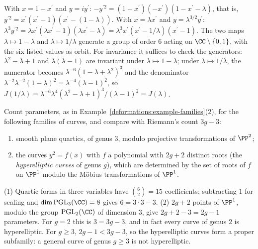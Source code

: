 \begin{solution}
With $x = 1 - x^{\prime}$ and $y = iy^{\prime}$: $-y^{\prime 2} = (1 - x^{\prime})(-x^{\prime})(1 - x^{\prime} - \lambda)$, that is, $y^{\prime 2} = x^{\prime}(x^{\prime} - 1)(x^{\prime} - (1 - \lambda))$. With $x = \lambda x^{\prime}$ and
$y = \lambda^{3/2}y^{\prime}$: $\lambda^3y^{\prime 2} = \lambda x^{\prime}(\lambda x^{\prime} - 1)(\lambda x^{\prime} - \lambda) = \lambda^3x^{\prime}(x^{\prime} - 1/\lambda)(x^{\prime} - 1)$. The two maps $\lambda \mapsto 1 - \lambda$ and
$\lambda \mapsto 1/\lambda$ generate a group of order $6$ acting on $\CC \setminus \{0, 1\}$, with the six listed values as orbit. For invariance it suffices to check the generators: $\lambda^2 - \lambda + 1$ and
$\lambda(\lambda - 1)$ are invariant under $\lambda \mapsto 1 - \lambda$; under $\lambda \mapsto 1/\lambda$, the numerator becomes $\lambda^{-6}(1 - \lambda + \lambda^2)^3$ and the denominator
$\lambda^{-2}\lambda^{-2}(1 - \lambda)^2 = \lambda^{-4}(\lambda - 1)^2$, so $J(1/\lambda) = \lambda^{-6}\lambda^4(\lambda^2 - \lambda + 1)^3/(\lambda - 1)^2 = J(\lambda)$.
\end{solution}

\begin{exercise}\label{deformations:exercise-parameter-counts}
Count parameters, as in Example~\ref{deformations:example-families}(2), for the following families of curves, and compare with Riemann's count $3g - 3$:
\begin{enumerate}
\item smooth plane quartics, of genus $3$, modulo projective transformations of $\PP^2$;
\item the curves $y^2 = f(x)$ with $f$ a polynomial with $2g + 2$ distinct roots (the \emph{hyperelliptic curves} of genus $g$), which are determined by the set of roots of $f$ on $\PP^1$ modulo
the M\"obius transformations of $\PP^1$.
\end{enumerate}
\end{exercise}

\begin{solution}
(1) Quartic forms in three variables have $\binom{6}{2} = 15$ coefficients; subtracting $1$ for scaling and $\dim\mathrm{PGL}_3(\CC) = 8$ gives $6 = 3 \cdot 3 - 3$. (2) $2g + 2$ points of $\PP^1$, modulo the group
$\mathrm{PGL}_2(\CC)$ of dimension $3$, give $2g + 2 - 3 = 2g - 1$ parameters. For $g = 2$ this is $3 = 3g - 3$, and in fact every curve of genus $2$ is hyperelliptic. For $g \geq 3$, $2g - 1 < 3g - 3$, so
the hyperelliptic curves form a proper subfamily: a general curve of genus $g \geq 3$ is not hyperelliptic.
\end{solution}
